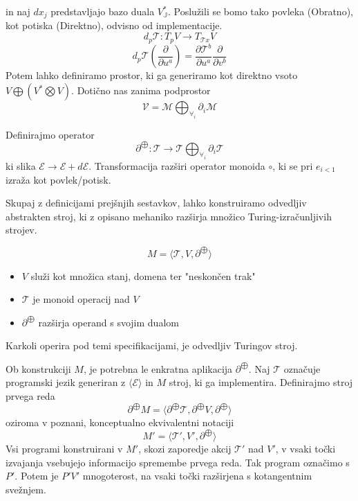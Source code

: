 \documentclass{article}
\newcommand{\JJ}{\mathbb{J}}
\newcommand{\E}{\mathcal{E}}
\newcommand{\T}{\mathcal{T}}
\newcommand{\Op}{\partial^{\bigoplus}}
\begin{document}
in naj $dx_j$ predstavljajo bazo duala $V_\JJ^{*}$. Poslužili se bomo tako povleka (Obratno), kot potiska (Direktno), odvisno od implementacije.
\begin{equation}\label{eq:pushfirward}
 d_p\T: T_pV\to T_{\T x}V
\end{equation}
\begin{equation}
 d_p\T(\frac{\partial}{\partial u^a})=\frac{\partial\T^b}{\partial u^a}\frac{\partial}{\partial v^b}
\end{equation}
Potem lahko definiramo prostor, ki ga generiramo kot direktno vsoto $V\bigoplus (V^*\bigotimes V)$. Dotično nas zanima podprostor
$$\mathcal{V}=\mathcal{M}\bigoplus_{\forall_i}\partial_i\mathcal{M}$$
  
  Definirajmo operator 
  \begin{equation}\label{eq:dirSumFun}
  \partial^{\bigoplus}:\T\to\T\bigoplus_{\forall_i}\partial_i\T
  \end{equation}
  ki slika $\E\to\E+d\E$. Transformacija razširi operator monoida $\circ$, ki se pri $e_{i<1}$ izraža kot povlek/potisk.
  
  Skupaj z definicijami prejšnjih sestavkov, lahko konstruiramo odvedljiv abstrakten stroj, ki z opisano mehaniko razširja množico Turing-izračunljivih strojev.
  
  \begin{equation}\label{eq:dTuring}
  M=\langle\T, V, \partial^{\bigoplus}\rangle
  \end{equation}

 \begin{itemize}
 \item
 $V$ služi kot množica stanj, domena ter "neskončen trak"
 \item
 $\T$ je monoid operacij nad $V$
 \item
 $\partial^{\bigoplus}$ razširja operand s svojim dualom 
 \end{itemize}
 
 Karkoli operira pod temi specifikacijami, je odvedljiv Turingov stroj.
 
 Ob konstrukciji $M$, je potrebna le enkratna aplikacija $\Op$. Naj $\T$ označuje programski jezik generiran z $\langle\E\rangle$ in $M$ stroj, ki ga implementira. Definirajmo stroj prvega reda
 \begin{equation}\label{eq:Mprime}
	 \Op M=\langle\Op\T, \Op V, \Op\rangle
 \end{equation}
 oziroma v poznani, konceptualno ekvivalentni notaciji
  \begin{equation}\label{eq:M'}
 	 M'=\langle\T', V', \Op\rangle
  \end{equation}
  Vsi programi konstruirani v $M'$, skozi zaporedje akcij $\T'$ nad $V'$, v vsaki točki izvajanja vsebujejo informacijo spremembe prvega reda. Tak program označimo s $P'$. Potem je $P'V'$ mnogoterost, na vsaki točki razširjena s kotangentnim svežnjem.
 
\end{document}
